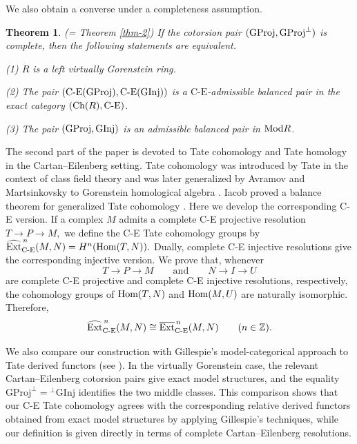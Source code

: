 \documentclass[reqno,12pt]{amsart}
\numberwithin{equation}{section}
\def\Ext{\mbox{\rm Ext}} \def\Tor{\mbox{\rm Tor}}\def\Hom{\mbox{\rm Hom}} \def\dim{\mbox{\rm dim}} \def\Iso{\mbox{\rm Iso}}
\def\dim{\mbox{\rm dim}}\def\Irr{\mbox{\rm Irr}}\def\rad{\mbox{\rm rad}}\def\fg{\mbox{\rm fg}}
\def\Ch{\mbox{\rm Ch}}
\theoremstyle{plain}
\newtheorem{theorem}{\bf Theorem}[section]
\theoremstyle{definition}
\newcommand{\CE}{\mathrm{C}\text{-}\mathrm{E}}
\newcommand{\GProj}{\mathrm{GProj}}
\newcommand{\GInj}{\mathrm{GInj}}
\begin{document}
We also obtain a converse under a completeness assumption.

   \begin{theorem}
        (= Theorem \ref{thm-2}) If the cotorsion pair $({\rm GProj},{\rm GProj}^{\bot})$ is complete, then the following statements are equivalent.

    {\rm (1)} $R$ is a left virtually Gorenstein ring.

    {\rm (2)} The pair $(\CE({\rm GProj}),\CE({\rm GInj}))$ is a $\CE$-admissible balanced pair in the exact category $(\Ch(R),\CE)$.

    {\rm (3)} The pair $({\rm GProj},{\rm GInj})$ is an admissible balanced pair in $\mbox{\rm Mod} R$.
    \end{theorem}

The second part of the paper is devoted to Tate cohomology and Tate homology in
the Cartan--Eilenberg setting. Tate cohomology was introduced by Tate \cite{T52} in the
context of class field theory and was later generalized by Avramov and
Martsinkovsky to Gorenstein homological algebra \cite{AM02}.
Iacob proved a balance theorem for generalized Tate cohomology \cite{I05}.
Here we develop the corresponding C-E version. If a complex $M$ admits a complete C-E
projective resolution $ T \longrightarrow P \longrightarrow M,$
we define the C-E Tate cohomology groups by $\widehat{\Ext}^{\,n}_{\text{\rm C-E}}(M,N)=H^n(\operatorname{Hom}(T,N)).$
Dually, complete C-E injective resolutions give the corresponding injective
version. We prove that, whenever
\[
T\longrightarrow P\longrightarrow M
\qquad\text{and}\qquad
N\longrightarrow I\longrightarrow U
\]
are complete C-E projective and complete C-E injective resolutions, respectively, the cohomology groups of $\Hom(T,N)$ and $\Hom(M,U)$ are naturally isomorphic. Therefore,
$$
\widehat{\Ext}^{\,n}_{\CE}(M,N)
\cong
\overline{\Ext}^{\,n}_{\CE}(M,N)
\qquad(n\in\mathbb Z).$$

We also compare our construction with Gillespie's model-categorical approach to Tate derived functors (see \cite{G21}). In the virtually Gorenstein case, the relevant Cartan--Eilenberg cotorsion pairs give exact model structures, and the equality \(\GProj^{\perp}={}^\perp\GInj\) identifies the two middle classes. This comparison shows that our C-E Tate cohomology agrees with the corresponding relative derived functors obtained from exact model structures by applying Gillespie's techniques, while our definition is given directly in terms of complete Cartan--Eilenberg resolutions.
\end{document}
